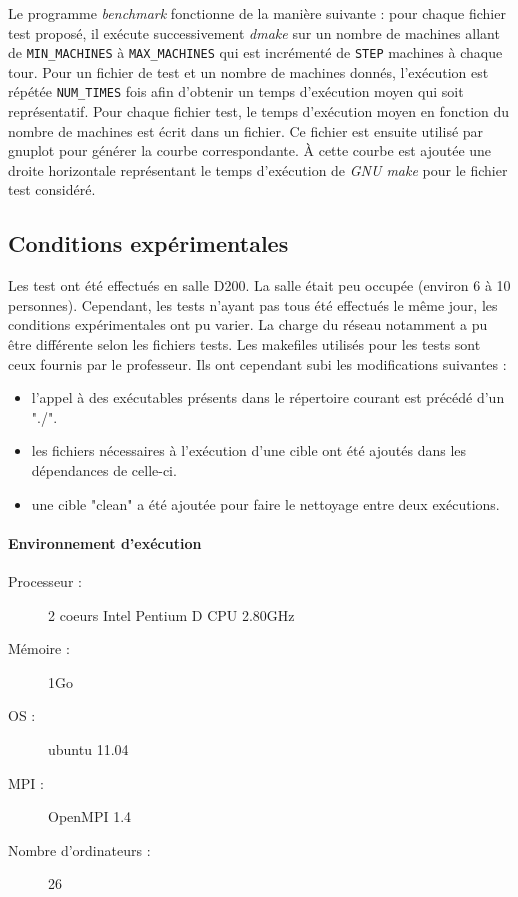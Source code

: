 \documentclass[a4paper,12pt,twoside]{article}
\begin{document}
Le programme \emph{benchmark} fonctionne de la manière suivante : pour
chaque fichier test proposé, il exécute successivement \emph{dmake} sur un nombre de
machines allant de \texttt{MIN\_MACHINES} à \texttt{MAX\_MACHINES}
qui est incrémenté de \texttt{STEP} machines à chaque tour. Pour un
fichier de test et un nombre de machines donnés, l'exécution est
répétée \texttt{NUM\_TIMES} fois afin d'obtenir un temps d'exécution moyen
qui soit représentatif. 
Pour chaque fichier test, le temps d'exécution moyen en fonction du
nombre de machines est écrit dans un fichier. Ce fichier est ensuite
utilisé par gnuplot pour générer la courbe correspondante. À cette
courbe est ajoutée une droite horizontale représentant le temps
d'exécution de \emph{GNU make} pour le fichier test considéré. 

\subsection{Conditions expérimentales}

Les test ont été effectués en salle D200. La salle était peu occupée
(environ 6 à 10 personnes). Cependant, les tests n'ayant pas tous été
effectués le même jour, les conditions expérimentales ont pu
varier. La charge du réseau notamment a pu être différente selon les
fichiers tests. Les makefiles utilisés pour les tests sont ceux
fournis par le professeur. Ils ont cependant subi les modifications
suivantes : 
\begin{itemize}
\item l'appel à des exécutables présents dans le répertoire courant est
  précédé d'un "./".
\item les fichiers nécessaires à l'exécution d'une cible ont été
  ajoutés dans les dépendances de celle-ci.
\item une cible "clean" a été ajoutée pour faire le nettoyage entre deux exécutions.
\end{itemize}

\paragraph{Environnement d'exécution}
\begin{description}
\item[Processeur :] 2 coeurs Intel Pentium D CPU 2.80GHz
\item[Mémoire :] 1Go
\item[OS :] ubuntu 11.04
\item[MPI :] OpenMPI 1.4
\item[Nombre d’ordinateurs :] 26
\end{description}
\end{document}
